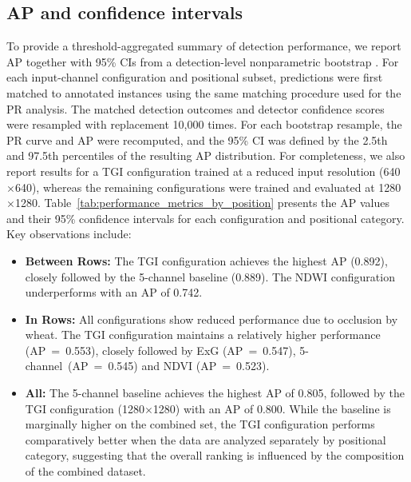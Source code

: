 \documentclass{ieeeaccess}
\begin{document}
\subsection{AP and confidence intervals}
To provide a threshold-aggregated summary of detection performance, we report AP \cite{lin_coco_2014} together with 95\% CIs from a detection-level nonparametric bootstrap \cite{efron1979bootstrap}.
For each input-channel configuration and positional subset, predictions were first matched to annotated instances using the same matching procedure used for the PR analysis. The matched detection outcomes and detector confidence scores were resampled with replacement 10{,}000 times. For each bootstrap resample, the PR curve and AP were recomputed, and the 95\% CI was defined by the 2.5th and 97.5th percentiles of the resulting AP distribution.
For completeness, we also report results for a TGI configuration trained at a reduced input resolution (640$\times$640), whereas the remaining configurations were trained and evaluated at 1280$\times$1280.
Table~\ref{tab:performance_metrics_by_position} presents the AP values and their 95\% confidence intervals for each configuration and positional category. Key observations include:
\begin{itemize}
    \item \textbf{Between Rows:} The TGI configuration achieves the highest AP (0.892), closely followed by the 5-channel baseline (0.889). The NDWI configuration underperforms with an AP of 0.742.
    \item \textbf{In Rows:} All configurations show reduced performance due to occlusion by wheat. The TGI configuration maintains a relatively higher performance (AP~=~0.553), closely followed by ExG (AP~=~0.547), \mbox{5-channel (AP~=~0.545)} and NDVI (AP~=~0.523).
    \item \textbf{All:} The 5-channel baseline achieves the highest AP of 0.805, followed by the TGI configuration (1280$\times$1280) with an AP of 0.800. While the baseline is marginally higher on the combined set, the TGI configuration performs comparatively better when the data are analyzed separately by positional category, suggesting that the overall ranking is influenced by the composition of the combined dataset.
\end{itemize}
\end{document}
